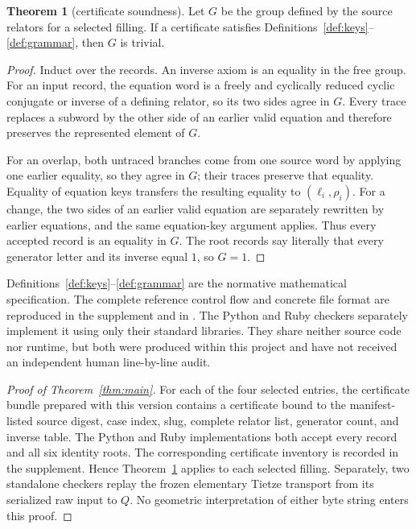 \documentclass[11pt]{article}
\theoremstyle{definition}
\newtheorem{theorem}{Theorem}[section]
\begin{document}
\begin{theorem}[certificate soundness]\label{thm:sound}
Let $G$ be the group defined by the source relators for a selected filling.
If a certificate satisfies Definitions~\ref{def:keys}--\ref{def:grammar},
then $G$ is trivial.
\end{theorem}

\begin{proof}
Induct over the records.  An inverse axiom is an equality in the free group.
For an input record, the equation word is a freely and cyclically reduced
cyclic conjugate or inverse of a defining relator, so its two sides agree in
$G$.  Every trace replaces a subword by the other side of an earlier valid
equation and therefore preserves the represented element of $G$.

For an overlap, both untraced branches come from one source word by applying
one earlier equality, so they agree in $G$; their traces preserve that
equality.  Equality of equation keys transfers the resulting equality to
$(\ell_i,\rho_i)$.  For a change, the two sides of an earlier valid equation
are separately rewritten by earlier equations, and the same equation-key
argument applies.  Thus every accepted record is an equality in $G$.  The
root records say literally that every generator letter and its inverse equal
$1$, so $G=1$.
\end{proof}

Definitions~\ref{def:keys}--\ref{def:grammar} are the normative mathematical
specification.  The complete reference control flow and concrete file format
are reproduced in the supplement and in
.  The Python and Ruby
checkers separately implement it using only their standard libraries.  They
share neither source code nor runtime, but both were produced within this
project and have not received an independent human line-by-line audit.

\begin{proof}[Proof of Theorem~\ref{thm:main}]
For each of the four selected entries, the certificate bundle prepared with
this version contains a certificate bound to the manifest-listed source digest,
case index, slug, complete
relator list, generator count, and inverse table.  The Python and Ruby
implementations both accept every record and all six identity roots.  The
corresponding certificate inventory is recorded in the supplement.  Hence
Theorem~\ref{thm:sound} applies to each selected filling.  Separately, two
standalone checkers replay the frozen elementary Tietze transport from its
serialized raw input to $Q$.  No geometric interpretation of either byte
string enters this proof.
\end{proof}
\end{document}
